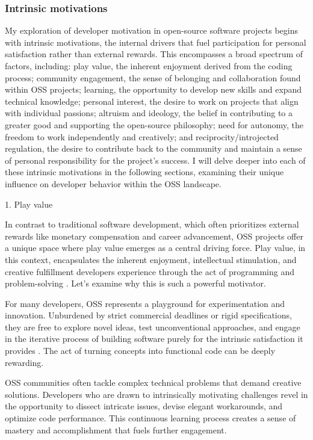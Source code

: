 \subsubsection{Intrinsic motivations}
My exploration of developer motivation in open-source software projects begins with intrinsic motivations, the internal drivers that fuel participation for personal satisfaction rather than external rewards. This encompasses a broad spectrum of factors, including: play value, the inherent enjoyment derived from the coding process; community engagement, the sense of belonging and collaboration found within OSS projects; learning, the opportunity to develop new skills and expand technical knowledge; personal interest, the desire to work on projects that align with individual passions; altruism and ideology, the belief in contributing to a greater good and supporting the open-source philosophy; need for autonomy, the freedom to work independently and creatively; and reciprocity/introjected regulation, the desire to contribute back to the community and maintain a sense of personal responsibility for the project's success. I will delve deeper into each of these intrinsic motivations in the following sections, examining their unique influence on developer behavior within the OSS landscape.

1. Play value

In contrast to traditional software development, which often prioritizes external rewards like monetary compensation and career advancement, OSS projects offer a unique space where play value emerges as a central driving force. Play value, in this context, encapsulates the inherent enjoyment, intellectual stimulation, and creative fulfillment developers experience through the act of programming and problem-solving \parencite{05bitzer2007intrinsic, 06ye2003toward, 08zhang2024paid, 09lakhani2005hackers, 11gerosa2021shifting, 12choi2015characteristics,13li2012leadership,16ke2008motivations,17alexander2002working, 18oreg2008exploring}. Let's examine why this is such a powerful motivator.

For many developers, OSS represents a playground for experimentation and innovation. Unburdened by strict commercial deadlines or rigid specifications, they are free to explore novel ideas, test unconventional approaches, and engage in the iterative process of building software purely for the intrinsic satisfaction it provides .  The act of turning concepts into functional code can be deeply rewarding.

OSS communities often tackle complex technical problems that demand creative solutions.  Developers who are drawn to intrinsically motivating challenges revel in the opportunity to dissect intricate issues, devise elegant workarounds, and optimize code performance. This continuous learning process creates a sense of mastery and accomplishment that fuels further engagement.

